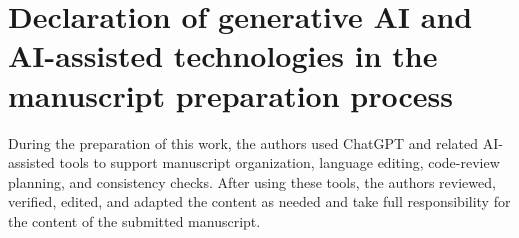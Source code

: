 \documentclass[a4paper,fleqn]{cas-sc}
\begin{document}
\section*{Declaration of generative AI and AI-assisted technologies in the manuscript preparation process}
During the preparation of this work, the authors used ChatGPT and related AI-assisted tools to support manuscript organization, language editing, code-review planning, and consistency checks. After using these tools, the authors reviewed, verified, edited, and adapted the content as needed and take full responsibility for the content of the submitted manuscript.

\FloatBarrier



\clearpage
\appendix
\setcounter{figure}{0}
\setcounter{table}{0}
\renewcommand{\thefigure}{A.\arabic{figure}}
\renewcommand{\thetable}{A.\arabic{table}}
\renewcommand{\theHfigure}{A.\arabic{figure}}
\renewcommand{\theHtable}{A.\arabic{table}}

\end{document}
